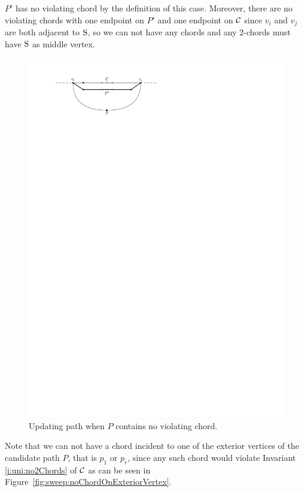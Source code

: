     $P'$ has no violating chord by the definition of this case. Moreover, there are no violating chords with one endpoint on $P'$ and one endpoint on $\mathcal{C}$ since $v_i$ and $v_j$ are both adjacent to $\mathrm{S}$, so we can not have any chords and any $2$-chords must have $\mathrm{S}$ as middle vertex.
    \begin{figure}[t]
      \centering
      \includegraphics[scale=1]{unifiedAlgo/img/sweep/cases/noIrregularity}
      \caption{Updating path when $P$ contains no violating chord.}
      \label{fig:sweep:noIrregularity}
    \end{figure}

    Note that we can not have a chord incident to one of the exterior vertices of the candidate path $P$, that is $p_1$ or $p_r$, since any such chord would violate Invariant \ref{i:uni:no2Chords} of $\mathcal{C}$ as can be seen in Figure~\ref{fig:sweep:noChordOnExteriorVertex}.


